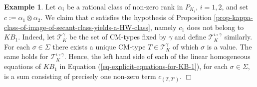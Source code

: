 \documentclass[12pt]{amsart}
\numberwithin{equation}{subsection}
\theoremstyle{plain}
\theoremstyle{definition}
\newtheorem{example}[thm]{Example}
\newcommand{\T}{{\mathcal T}}
\newcommand{\EndProof}{\hfill  $\Box$}
\begin{document}
{\begin{example}
Let $\alpha_i$ be a rational class of non-zero rank in $P_{K_i}$, $i=1,2$, and set $c:=\alpha_1\otimes \alpha_2$. We claim that $c$ satisfies the hypothesis of Proposition \ref{prop-kappa-class-of-image-of-secant-class-yields-a-HW-class}, namely 
$c_1$ does not belong to $KB_1$. Indeed,
let $\T_K^\gamma$ be the set of CM-types fixed by $\gamma$ and define $\T_K^{\iota\circ\gamma}$ similarly. For each $\sigma\in\Sigma$ there exists a unique CM-type $T\in \T_K^\gamma$ of which $\sigma$ is a value. The same holds for $\T_K^{\iota\circ\gamma}$. 
Hence, the left hand side of each of the linear homogeneous equations of $KB_1$ in Equation (\ref{eq-explicit-equations-for-KB-1}), for each $\sigma\in\Sigma$, is a sum consisting of precisely one non-zero term $c_{(T,T')}$.
\EndProof
\end{example}

}
\end{document}
